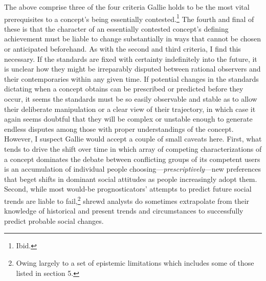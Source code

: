The above comprise three of the four criteria Gallie holds to be the
most vital prerequisites to a concept's being essentially
contested.\footnote{Ibid.} The fourth and final of these is that the
character of an essentially contested concept's defining achievement
must be liable to change substantially in ways that cannot be chosen or
anticipated beforehand. As with the second and third criteria, I find
this necessary. If the standards are fixed with certainty indefinitely
into the future, it is unclear how they might be irreparably disputed
between rational observers and their contemporaries within any given
time. If potential changes in the standards dictating when a concept
obtains can be prescribed or predicted before they occur, it seems the
standards must be so easily observable and stable as to allow their
deliberate manipulation or a clear view of their trajectory, in which
case it again seems doubtful that they will be complex or unstable
enough to generate endless disputes among those with proper
understandings of the concept. However, I suspect Gallie would accept a
couple of small caveats here. First, what tends to drive the shift over
time in which array of competing characterizations of a concept
dominates the debate between conflicting groups of its competent users
is an accumulation of individual people
choosing---\emph{prescriptively}---new preferences that beget shifts in
dominant social attitudes as people increasingly adopt them. Second,
while most would-be prognosticators' attempts to predict future social
trends are liable to fail,\footnote{Owing largely to a set of epistemic
  limitations which includes some of those listed in section 5.} shrewd
analysts do sometimes extrapolate from their knowledge of historical and
present trends and circumstances to successfully predict probable social
changes.

